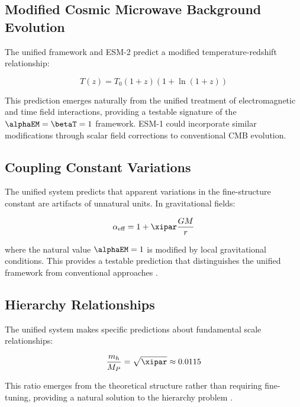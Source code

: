 	\subsection{Modified Cosmic Microwave Background Evolution}
	\label{subsec:cmb_evolution}
	
	The unified framework and ESM-2 predict a modified temperature-redshift relationship:
	
	\begin{equation}
		T(z) = T_0(1+z)(1+\ln(1+z))
	\end{equation}
	
	This prediction emerges naturally from the unified treatment of electromagnetic and time field interactions, providing a testable signature of the $\alphaEM = \betaT = 1$ framework. ESM-1 could incorporate similar modifications through scalar field corrections to conventional CMB evolution.
	
	\subsection{Coupling Constant Variations}
	\label{subsec:coupling_variations}
	
	The unified system predicts that apparent variations in the fine-structure constant are artifacts of unnatural units. In gravitational fields:
	
	\begin{equation}
		\alpha_{\text{eff}} = 1 + \xipar \frac{GM}{r}
	\end{equation}
	
	where the natural value $\alphaEM = 1$ is modified by local gravitational conditions. This provides a testable prediction that distinguishes the unified framework from conventional approaches \cite{Will2014,Webb2001}.
	
	\subsection{Hierarchy Relationships}
	\label{subsec:hierarchy_relationships}
	
	The unified system makes specific predictions about fundamental scale relationships:
	
	\begin{equation}
		\frac{m_h}{M_P} = \sqrt{\xipar} \approx 0.0115
	\end{equation}
	
	This ratio emerges from the theoretical structure rather than requiring fine-tuning, providing a natural solution to the hierarchy problem \cite{pascher_beta_derivation_2025}.
	
